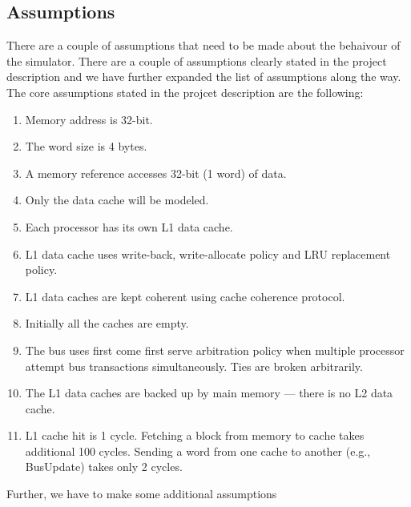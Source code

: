 \subsection{Assumptions}

There are a couple of assumptions that need to be made about the behaivour of the simulator. There are a couple of assumptions clearly stated in the project description and we have further expanded the list of assumptions along the way. The core assumptions stated in the projcet description are the following:

\begin{enumerate}
    \item Memory address is 32-bit. 
    \item The word size is 4 bytes.
    \item A memory reference accesses 32-bit (1 word) of data.
    \item Only the data cache will be modeled.
    \item Each processor has its own L1 data cache.
    \item L1 data cache uses write-back, write-allocate policy and LRU replacement policy.
    \item L1 data caches are kept coherent using cache coherence protocol.
    \item Initially all the caches are empty.
    \item The bus uses first come first serve arbitration policy when multiple processor attempt bus
          transactions simultaneously. Ties are broken arbitrarily.
    \item The L1 data caches are backed up by main memory --- there is no L2 data cache.
    \item L1 cache hit is 1 cycle. Fetching a block from memory to cache takes additional 100 cycles.
          Sending a word from one cache to another (e.g., BusUpdate) takes only 2 cycles.
\end{enumerate}

Further, we have to make some additional assumptions

